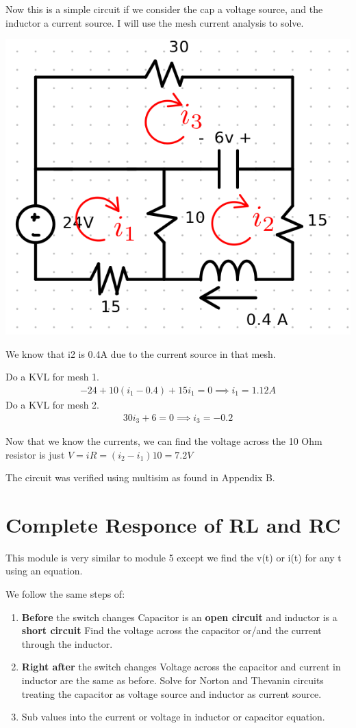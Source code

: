 \documentclass[12pt,letterpaper]{article} \usepackage{amsmath} \usepackage{graphicx} \usepackage[margin=1in]{geometry} \usepackage{longtable}  \usepackage{amssymb}
\begin{document}
\begin{mdframed}[]
	Now this is a simple circuit if we consider the cap a voltage source, and the inductor a current source. I will use the mesh current analysis to solve. 
	\begin{center}
		\includegraphics[width=0.3\linewidth]{ex3-4}
	\end{center}
	We know that i2 is 0.4A due to the current source in that mesh.
	
	Do a KVL for mesh 1.
	\begin{align*}
		-24+10(i_1-0.4)+15i_1 = 0 \implies i_1 = 1.12 A
	\end{align*}
	Do a KVL for mesh 2.
	\begin{align*}
		30i_3+6=0 \implies i_3 = -0.2
	\end{align*}
	
	Now that we know the currents, we can find the voltage across the 10 Ohm resistor is just $V=iR=(i_2-i_1)10=7.2 V$
	
	The circuit was verified using multisim as found in Appendix B.
	\end{mdframed}
	
	\section{Complete Responce of RL and RC}
	This module is very similar to module 5 except we find the v(t) or i(t) for any t using an equation. 
	
	We follow the same steps of: 
	\begin{enumerate}[noitemsep]
		\item \textbf{Before} the switch changes
		\subitem Capacitor is an \textbf{open circuit }and inductor is a \textbf{short circuit}
		\subitem Find the voltage across the capacitor or/and the current through the inductor.
		\item \textbf{Right after} the switch changes
		\subitem Voltage across the capacitor and current in inductor are the same as before.
		\subitem Solve for Norton and Thevanin circuits treating the capacitor as voltage source and inductor as current source.
		\item Sub values into the current or voltage in inductor or capacitor equation.
	\end{enumerate}
	
\end{document}
